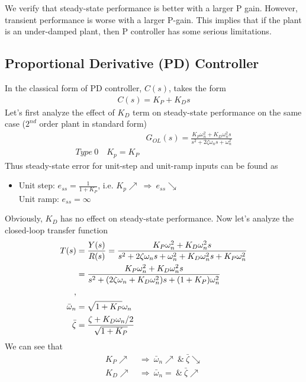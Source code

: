\documentclass[twoside]{article}
\begin{document}
\vspace{12 pt}

We verify that steady-state performance is better with a larger
P gain. However, transient performance is worse with a
larger P-gain. This implies that if the plant is an under-damped
plant, then P controller has some serious limitations. 


\subsection{Proportional Derivative (PD) Controller}

In the classical form of PD controller, $C(s)$, takes the form
%
\begin{align*}
 C(s) = K_P + K_D s
\end{align*}
%
Let's first analyze the effect of $K_D$ term on steady-state 
performance on the same case ($2^{nd}$ order plant in standard form) 
%
\begin{align*}
  &G_{OL}(s) = \frac{K_P \omega_n^2 + K_D \omega_n^2 s}{s^2 + 2 \zeta
    \omega_n s + \omega_n^2}
\\
 Type \ 0 \quad K_p = K_P
\end{align*}
% 
Thus steady-state error for unit-step and unit-ramp inputs can be found
as
\begin{itemize}
\item Unit step: $e_{ss} = \frac{1}{1 + K_P}$, i.e. $K_p \nearrow \
  \Rightarrow \ e_{ss} \searrow$  
\\ Unit ramp: $e_{ss} = \infty$
\end{itemize}
Obviously, $K_D$ has no effect on steady-state performance. Now
let's analyze the closed-loop transfer function
%
  \begin{align*}
  T(s) &= \frac{Y(s)}{R(s)} = \frac{K_P \omega_n^2 + K_D \omega_n^2 s}{s^2 + 2 \zeta
    \omega_n  s + \omega_n^2 + K_D \omega_n^2 s + K_P \omega_n^2}
\\
  &=   \frac{K_P \omega_n^2 + K_D \omega_n^2 s}{s^2 + ( 2 \zeta
    \omega_n + K_D \omega_n^2) s + (1 + K_P) \omega_n^2}
\\
,
\\
 \Bar{\omega}_n &= \sqrt{1 + K_P} \omega_n
\\
 \bar{\zeta} &= \frac{\zeta + K_D \omega_n / 2}{ \sqrt{ 1 + K_P} } 
  \end{align*}
%
We can see that
%
  \begin{align*}
    K_P \nearrow \ &\Rightarrow \ \bar{\omega}_n \nearrow \ \& \ \bar{\zeta} \searrow
\\
   K_D \nearrow \ &\Rightarrow \ \bar{\omega}_n = \ \& \ \bar{\zeta} \nearrow
  \end{align*}
\end{document}
